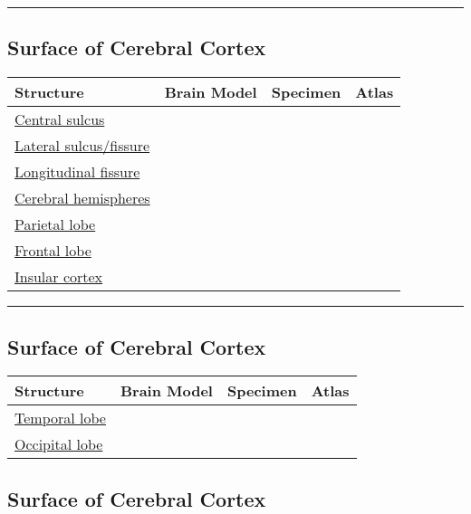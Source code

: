 \documentclass[]{article}
\begin{document}
\begin{center}\rule{0.5\linewidth}{\linethickness}\end{center}

\hypertarget{surface-of-cerebral-cortex}{%
\subsection{Surface of Cerebral
Cortex}\label{surface-of-cerebral-cortex}}

\begin{longtable}[]{@{}llll@{}}
\toprule
Structure & Brain Model & Specimen & Atlas\tabularnewline
\midrule
\endhead
\href{https://en.wikipedia.org/wiki/Central_sulcus}{Central sulcus} & &
&\tabularnewline
\href{https://en.wikipedia.org/wiki/Lateral_sulcus}{Lateral
sulcus/fissure} & & &\tabularnewline
\href{https://en.wikipedia.org/wiki/Medial_longitudinal_fissure}{Longitudinal
fissure} & & &\tabularnewline
\href{https://en.wikipedia.org/wiki/Cerebral_hemisphere}{Cerebral
hemispheres} & & &\tabularnewline
\href{https://en.wikipedia.org/wiki/Parietal_lobe}{Parietal lobe} & &
&\tabularnewline
\href{https://en.wikipedia.org/wiki/Frontal_lobe}{Frontal lobe} & &
&\tabularnewline
\href{https://en.wikipedia.org/wiki/Insular_cortex}{Insular cortex} & &
&\tabularnewline
\bottomrule
\end{longtable}

\begin{center}\rule{0.5\linewidth}{\linethickness}\end{center}

\hypertarget{surface-of-cerebral-cortex-1}{%
\subsection{Surface of Cerebral
Cortex}\label{surface-of-cerebral-cortex-1}}

\begin{longtable}[]{@{}llll@{}}
\toprule
Structure & Brain Model & Specimen & Atlas\tabularnewline
\midrule
\endhead
\href{https://en.wikipedia.org/wiki/Temporal_lobe}{Temporal lobe} & &
&\tabularnewline
\href{https://en.wikipedia.org/wiki/Occipital_lobe}{Occipital lobe} & &
&\tabularnewline
\bottomrule
\end{longtable}

\hypertarget{surface-of-cerebral-cortex-2}{%
\subsection{Surface of Cerebral
Cortex}\label{surface-of-cerebral-cortex-2}}
\end{document}
